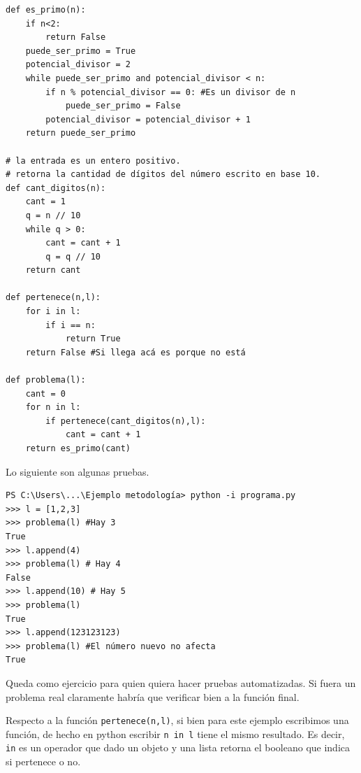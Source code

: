 \documentclass[a4paper, 12pt]{report}
\theoremstyle{definition}
\begin{document}
\begin{verbatim}
def es_primo(n):
    if n<2:
        return False
    puede_ser_primo = True
    potencial_divisor = 2
    while puede_ser_primo and potencial_divisor < n:
        if n % potencial_divisor == 0: #Es un divisor de n
            puede_ser_primo = False
        potencial_divisor = potencial_divisor + 1
    return puede_ser_primo
    
# la entrada es un entero positivo.
# retorna la cantidad de dígitos del número escrito en base 10.
def cant_digitos(n):
    cant = 1
    q = n // 10
    while q > 0:
        cant = cant + 1
        q = q // 10
    return cant

def pertenece(n,l):
    for i in l:
        if i == n:
            return True
    return False #Si llega acá es porque no está

def problema(l):
    cant = 0
    for n in l:
        if pertenece(cant_digitos(n),l):
            cant = cant + 1
    return es_primo(cant)
\end{verbatim}

Lo siguiente son algunas pruebas.
\begin{verbatim}
PS C:\Users\...\Ejemplo metodología> python -i programa.py
>>> l = [1,2,3] 
>>> problema(l) #Hay 3
True
>>> l.append(4)
>>> problema(l) # Hay 4
False
>>> l.append(10) # Hay 5
>>> problema(l)
True
>>> l.append(123123123) 
>>> problema(l) #El número nuevo no afecta
True
\end{verbatim}
Queda como ejercicio para quien quiera hacer pruebas automatizadas. Si fuera un problema real claramente habría que verificar bien a la función final.

Respecto a la función {\tt pertenece(n,l)}, si bien para este ejemplo escribimos una función, de hecho en python escribir {\tt n in l} tiene el mismo resultado. Es decir, {\tt in} es un operador que dado un objeto y una lista retorna el booleano que indica si pertenece o no.
\end{document}
